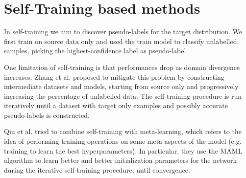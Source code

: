 \section{Self-Training based methods}
In self-training we aim to discover pseudo-labels for the target distribution. We first train on source data only and used the train model to classify unlabelled samples, picking the highest-confidence label as pseudo-label.

One limitation of self-training is that performances drop as domain divergence increases. Zhang et al.\cite{Deng2021} proposed to mitigate this problem by constructing intermediate datasets and models, starting from source only and progressively increasing the percentage of unlabelled data. The self-training procedure is run iteratively until a dataset with target only examples and possibly accurate pseudo-labels is constructed.

Qiu et al.\cite{Qiu2021} tried to combine self-training with meta-learning, which refers to the idea of performing training operations on some meta-aspects of the model (e.g. training to learn the best hyperparameters). In particular, they use the MAML algorithm to learn better and better initialization parameters for the network during the iterative self-training procedure, until convergence. 